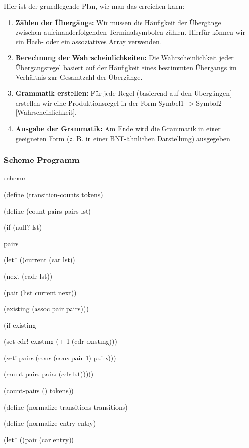\documentclass[
]{article}
\begin{document}
Hier ist der grundlegende Plan, wie man das erreichen kann:

\begin{enumerate}
\def\labelenumi{\arabic{enumi}.}
\item
  \textbf{Zählen der Übergänge:} Wir müssen die Häufigkeit der Übergänge
  zwischen aufeinanderfolgenden Terminalsymbolen zählen. Hierfür können
  wir ein Hash- oder ein assoziatives Array verwenden.
\item
  \textbf{Berechnung der Wahrscheinlichkeiten:} Die Wahrscheinlichkeit
  jeder Übergangsregel basiert auf der Häufigkeit eines bestimmten
  Übergangs im Verhältnis zur Gesamtzahl der Übergänge.
\item
  \textbf{Grammatik erstellen:} Für jede Regel (basierend auf den
  Übergängen) erstellen wir eine Produktionsregel in der Form Symbol1
  -\textgreater{} Symbol2 {[}Wahrscheinlichkeit{]}.
\item
  \textbf{Ausgabe der Grammatik:} Am Ende wird die Grammatik in einer
  geeigneten Form (z. B. in einer BNF-ähnlichen Darstellung) ausgegeben.
\end{enumerate}

\subsubsection{\texorpdfstring{\textbf{Scheme-Programm}}{Scheme-Programm}}\label{scheme-programm}

scheme

(define (transition-counts tokens)

(define (count-pairs pairs lst)

(if (null? lst)

pairs

(let* ((current (car lst))

(next (cadr lst))

(pair (list current next))

(existing (assoc pair pairs)))

(if existing

(set-cdr! existing (+ 1 (cdr existing)))

(set! pairs (cons (cons pair 1) pairs)))

(count-pairs pairs (cdr lst)))))

(count-pairs \textquotesingle() tokens))

(define (normalize-transitions transitions)

(define (normalize-entry entry)

(let* ((pair (car entry))
\end{document}
